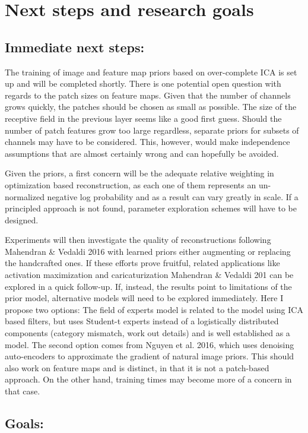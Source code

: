 \documentclass{article}
\begin{document}
\section{Next steps and research goals}

\subsection{Immediate next steps:}

The training of image and feature map priors based on over-complete ICA is set up and will be completed shortly. There is one potential open question with regards to the patch sizes on feature maps. Given that the number of channels grows quickly, the patches should be chosen as small as possible. The size of the receptive field in the previous layer seems like a good first guess. Should the number of patch features grow too large regardless, separate priors for subsets of channels may have to be considered. This, however, would make independence assumptions that are almost certainly wrong and can hopefully be avoided. 

Given the priors, a first concern will be the adequate relative weighting in optimization based reconstruction, as each one of them represents an un-normalized negative log probability and as a result can vary greatly in scale. If a principled approach is not found, parameter exploration schemes will have to be designed.

Experiments will then investigate the quality of reconstructions following Mahendran \& Vedaldi 2016 with learned priors either augmenting or replacing the handcrafted ones.
If these efforts prove fruitful, related applications like activation maximization and caricaturization Mahendran \& Vedaldi 201 can be explored in a quick follow-up. If, instead, the results point to limitations of the prior model, alternative models will need to be explored immediately. Here I propose two options: The field of experts model is related to the model using ICA based filters, but uses Student-t experts instead of a logistically distributed components (category mismatch, work out details) and is well established as a model. The second option comes from Nguyen et al. 2016, which uses denoising auto-encoders to approximate the gradient of natural image priors. This should also work on feature maps and is distinct, in that it is not a patch-based approach. On the other hand, training times may become more of a concern in that case.

\subsection{Goals:}
\end{document}
